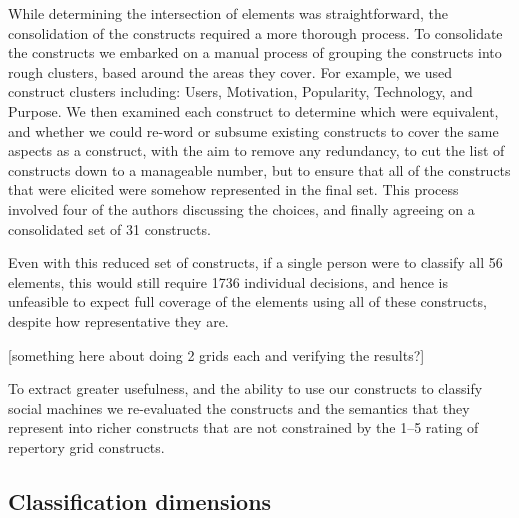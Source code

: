\documentclass{sig-alternate}
\begin{document}
While determining the intersection of elements was straightforward, the consolidation of the
constructs required a more thorough process. To consolidate the constructs we embarked on a manual process of grouping the constructs
into rough clusters, based around the areas they cover. For example, we used construct
clusters including: Users, Motivation, Popularity, Technology, and Purpose. We then examined
each construct to determine which were equivalent, and whether we could re-word or subsume
existing constructs to cover the same aspects as a construct, with the aim to remove any
redundancy, to cut the list of constructs down to a manageable number, but to ensure that
all of the constructs that were elicited were somehow represented in the final set. This
process involved four of the authors discussing the choices, and finally agreeing on a
consolidated set of 31 constructs.

Even with this reduced set of constructs, if a single person were to classify all 56
elements, this would still require 1736 individual decisions, and hence is unfeasible to
expect full coverage of the elements using all of these constructs, despite how representative
they are.


[something here about doing 2 grids each and verifying the results?]

To extract greater usefulness, and the ability to use our constructs to classify social
machines we re-evaluated the constructs and the semantics that they represent into richer
constructs that are not constrained by the 1--5 rating of repertory grid constructs.

\subsection{Classification dimensions}
\end{document}

